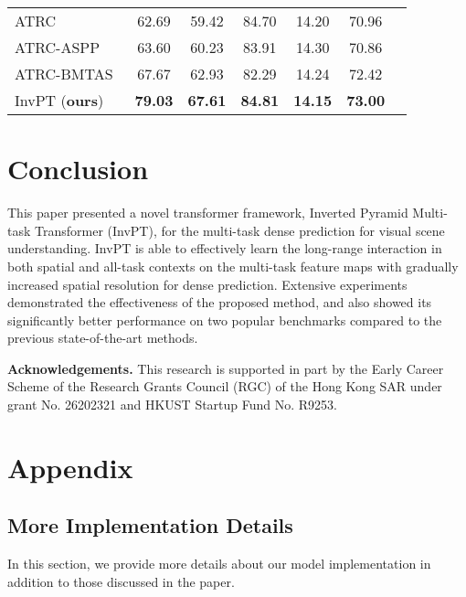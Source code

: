 \documentclass[runningheads]{llncs}
\begin{document}
\begin{table}[t]
\begin{minipage}[c]{\textwidth}
\begin{subtable}[t]{0.531\textwidth}
{{\begin{tabular}{lcccccc}
    ATRC~\cite{atrc}  & 62.69 & 59.42 & 84.70 & 14.20 & 70.96\\
    ATRC-ASPP~\cite{atrc}  & 63.60 & 60.23 & 83.91 & 14.30 & 70.86\\
    ATRC-BMTAS~\cite{atrc}  & 67.67 & 62.93 & 82.29 & 14.24 & 72.42\\
    InvPT (\textbf{ours}) & \textbf{79.03} & \textbf{67.61} & \textbf{84.81} & \textbf{14.15} & \textbf{73.00}\\
    \bottomrule
    \end{tabular}}}
    \label{tab:sota_pascal}
\end{subtable}
\end{minipage}
\vspace{-20pt}
\end{table}

\section{Conclusion}
This paper presented a novel transformer framework, Inverted Pyramid Multi-task Transformer (InvPT), for the multi-task  dense prediction for visual scene understanding.
InvPT is able to effectively learn the long-range interaction in both spatial and all-task contexts on the multi-task feature maps with gradually increased spatial resolution for dense prediction.
Extensive experiments demonstrated the effectiveness of the proposed method, and also showed its significantly better performance on two popular benchmarks compared to the previous state-of-the-art methods.

\par \noindent \textbf{Acknowledgements.}
This research is supported in part by the Early Career Scheme of the Research Grants Council (RGC) of the Hong Kong SAR under grant No. 26202321 and HKUST Startup Fund No. R9253.



\clearpage


\clearpage

\appendix
\section{Appendix}
\subsection{More Implementation Details}
In this section, we provide more details about our model implementation in addition to those discussed in the paper. 
\end{document}

